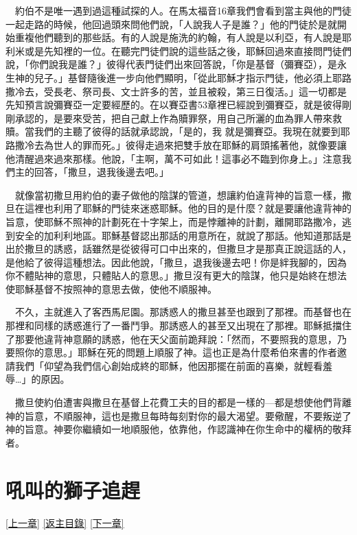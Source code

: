 \documentclass{book}
\begin{document}
　約伯不是唯一遇到過這種試探的人。在馬太福音16章我們會看到當主與他的門徒一起走路的時候，他回過頭來問他們說，「人說我人子是誰？」他的門徒於是就開始重複他們聽到的那些話。有的人說是施洗的約翰，有人說是以利亞，有人說是耶利米或是先知裡的一位。在聽完門徒們說的這些話之後，耶穌回過來直接問門徒們說，「你們說我是誰？」彼得代表門徒們出來回答說，「你是基督（彌賽亞），是永生神的兒子。」基督隨後進一步向他們顯明，「從此耶穌才指示門徒，他必須上耶路撒冷去，受長老、祭司長、文士許多的苦，並且被殺，第三日復活。」這一切都是先知預言說彌賽亞一定要經歷的。在以賽亞書53章裡已經說到彌賽亞，就是彼得剛剛承認的，是要來受苦，把自己獻上作為贖罪祭，用自己所灑的血為罪人帶來救贖。當我們的主聽了彼得的話就承認說，「是的，我 就是彌賽亞。我現在就要到耶路撒冷去為世人的罪而死。」彼得走過來把雙手放在耶穌的肩頭搖著他，就像要讓他清醒過來過來那樣。他說，「主啊，萬不可如此！這事必不臨到你身上。」注意我們主的回答，「撒旦，退我後邊去吧。」

　就像當初撒旦用約伯的妻子做他的陰謀的管道，想讓約伯違背神的旨意一樣，撒旦在這裡也利用了耶穌的門徒來迷惑耶穌。他的目的是什麼？就是要讓他違背神的旨意，使耶穌不照神的計劃死在十字架上，而是悖離神的計劃，離開耶路撒冷，逃到安全的加利利地區。耶穌基督認出那話的用意所在，就說了那話。他知道那話是出於撒旦的誘惑，話雖然是從彼得可口中出來的，但撒旦才是那真正說這話的人，是他給了彼得這種想法。因此他說，「撒旦，退我後邊去吧！你是絆我腳的，因為你不體貼神的意思，只體貼人的意思。」撒旦沒有更大的陰謀，他只是始終在想法使耶穌基督不按照神的意思去做，使他不順服神。

　不久，主就進入了客西馬尼園。那誘惑人的撒旦甚至也跟到了那裡。而基督也在那裡和同樣的誘惑進行了一番鬥爭。那誘惑人的甚至又出現在了那裡。耶穌抵擋住了那要他違背神意願的誘惑，他在天父面前跪拜說：「然而，不要照我的意思，乃要照你的意思。」耶穌在死的問題上順服了神。這也正是為什麼希伯來書的作者邀請我們「仰望為我們信心創始成終的耶穌，他因那擺在前面的喜樂，就輕看羞辱…」的原因。

　撒旦使約伯遭害與撒旦在基督上花費工夫的目的都是一樣的---都是想使他們背離神的旨意，不順服神，這也是撒旦每時每刻對你的最大渴望。要儆醒，不要叛逆了神的旨意。神要你繼續如一地順服他，依靠他，作認識神在你生命中的權柄的敬拜者。

\chapter{吼叫的獅子追趕}
\label{sec:ch10}
\hyperref[sec:ch09]{[上一章]}
\hyperlink{toc}{[返主目錄]}
\hyperref[sec:ch11]{[下一章]}
\end{document}
